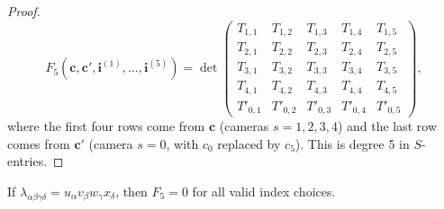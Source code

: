 \begin{proof}
\begin{equation}\label{eq:p9-degree5poly}
  \boxed{F_5(\mathbf{c},\mathbf{c}',\mathbf{i}^{(1)},\ldots,\mathbf{i}^{(5)})
  = \det\!\begin{pmatrix}
    T_{1,1} & T_{1,2} & T_{1,3} & T_{1,4} & T_{1,5}\\
    T_{2,1} & T_{2,2} & T_{2,3} & T_{2,4} & T_{2,5}\\
    T_{3,1} & T_{3,2} & T_{3,3} & T_{3,4} & T_{3,5}\\
    T_{4,1} & T_{4,2} & T_{4,3} & T_{4,4} & T_{4,5}\\
    T'_{0,1} & T'_{0,2} & T'_{0,3} & T'_{0,4} & T'_{0,5}
  \end{pmatrix},}
\end{equation}
where the first four rows come from $\mathbf{c}$ (cameras $s=1,2,3,4$) and
the last row comes from $\mathbf{c}'$ (camera $s=0$, with $c_0$ replaced by $c_5$).
This is degree 5 in $S$-entries.
\end{proof}

\begin{proposition}[Necessity: rank-1 $\lambda$ implies $F_5 = 0$]\label{prop:p9-nec}
If $\lambda_{\alpha\beta\gamma\delta} = u_\alpha v_\beta w_\gamma x_\delta$,
then $F_5 = 0$ for all valid index choices.
\end{proposition}

